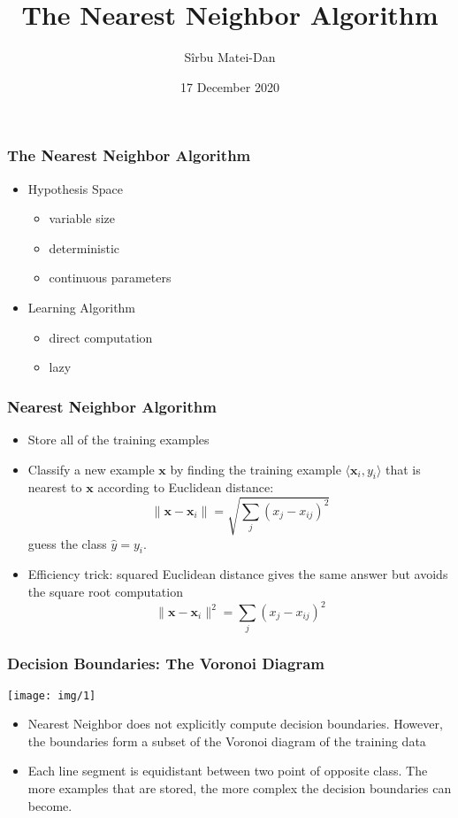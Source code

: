 \documentclass{beamer}
\title{\bf The Nearest Neighbor Algorithm}
\author[hello@msirbu.eu]{Sîrbu Matei-Dan}
\institute[]{Transilvania University of Brașov \\ The Faculty of Mathematics and Computer Science}
\date{17 December 2020}
\newcommand*{\utb}{\item[{\texttt{[image: img/UTSymbols-Bullet.png]}}]}
\begin{document}
\frame{\titlepage}

\begin{frame}
    \frametitle{The Nearest Neighbor Algorithm}
    \begin{itemize}
        \utb Hypothesis Space
        \begin{itemize}
            \utb variable size
            \utb deterministic
            \utb continuous parameters
        \end{itemize}
    \end{itemize}
    \begin{itemize}
        \utb Learning Algorithm
        \begin{itemize}
            \utb direct computation
            \utb lazy
        \end{itemize}
    \end{itemize}
\end{frame}

\begin{frame}
    \frametitle{Nearest Neighbor Algorithm}
    \begin{itemize}
        \utb Store all of the training examples
        \utb Classify a new example $\mathbf{x}$ by finding the training example $\langle \mathbf{x}_i, y_i \rangle$ that is nearest to $\mathbf{x}$ according to Euclidean distance: $$\lVert \mathbf{x} - \mathbf{x}_i \rVert = \sqrt{\sum_j (x_j - x_{ij})^2}$$
        guess the class $\hat{y} = y_i$.
        \utb Efficiency trick: squared Euclidean distance gives the same answer but avoids the square root computation $$\lVert \mathbf{x} - \mathbf{x}_i \rVert^2 = \sum_j (x_j - x_{ij})^2$$
    \end{itemize}
\end{frame}

\begin{frame}
    \frametitle{Decision Boundaries: The Voronoi Diagram}
    \begin{center}
        \texttt{[image: img/1]}
    \end{center}
    \begin{itemize}
        \utb Nearest Neighbor does not explicitly compute decision boundaries. However, the boundaries form a subset of the Voronoi diagram of the training data
        \utb Each line segment is equidistant between two point of opposite class. The more examples that are stored, the more complex the decision boundaries can become.
    \end{itemize}
\end{frame}
\end{document}
